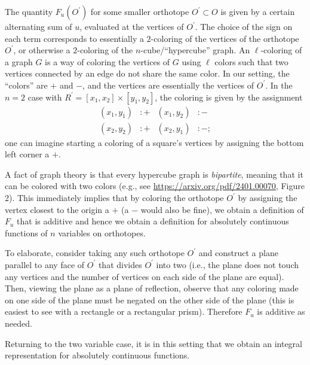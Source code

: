 \documentclass[11pt,leqno]{article}
\theoremstyle{plain}
\theoremstyle{definition}
\numberwithin{equation}{section}
\numberwithin{lem}{section}
\begin{document}
The quantity $F_u(O^\prime)$ for some smaller orthotope $O^\prime\subset O$ is given by a certain alternating sum of $u$, evaluated at the vertices of $O^\prime$. The choice of the sign on each term corresponds to essentially a $2$-coloring of the vertices of the orthotope $O^\prime$, or otherwise a $2$-coloring of the $n$-cube/``hypercube'' graph. An $\ell$-coloring of a graph $G$ is a way of coloring the vertices of $G$ using $\ell$ colors such that two vertices connected by an edge do not share the same color. In our setting, the ``colors'' are $+$ and $-$, and the vertices are essentially the vertices of $O^\prime$. In the $n=2$ case with $R^\prime = [x_1,x_2]\times[y_1,y_2]$, the coloring is given by the assignment
\begin{align*}
    (x_1,y_1) &: + & (x_1,y_2) &: - \\
    (x_2,y_2) &: + & (x_2,y_1) &: -;
\end{align*}
one can imagine starting a coloring of a square's vertices by assigning the bottom left corner a $+$.

A fact of graph theory is that every hypercube graph is \textit{bipartite}, meaning that it can be colored with two colors (e.g., see \href{https://arxiv.org/pdf/2401.00070}{https://arxiv.org/pdf/2401.00070}, Figure 2). This immediately implies that by coloring the orthotope $O^\prime$ by assigning the vertex closest to the origin a $+$ (a $-$ would also be fine), we obtain a definition of $F_u$ that is additive and hence we obtain a definition for absolutely continuous functions of $n$ variables on orthotopes.

To elaborate, consider taking any such orthotope $O^\prime$ and construct a plane parallel to any face of $O^\prime$ that divides $O^\prime$ into two (i.e., the plane does not touch any vertices and the number of vertices on each side of the plane are equal). Then, viewing the plane as a plane of reflection, observe that any coloring made on one side of the plane must be negated on the other side of the plane (this is easiest to see with a rectangle or a rectangular prism). Therefore $F_u$ is additive as needed.

Returning to the two variable case, it is in this setting that we obtain an integral representation for absolutely continuous functions.
\end{document}
